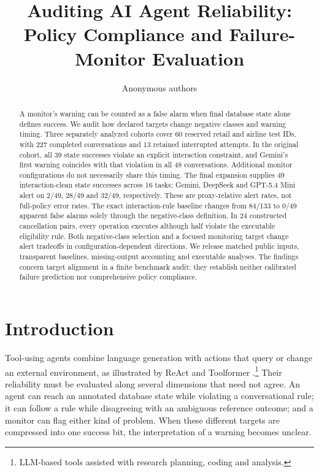 \documentclass[10pt]{article}
\title{Auditing AI Agent Reliability:\\Policy Compliance and Failure-Monitor Evaluation}
\author{Anonymous authors}
\begin{document}
\maketitle
\begin{abstract}
A monitor's warning can be counted as a false alarm when final database state alone defines success. We audit how declared targets change negative classes and warning timing. Three separately analyzed cohorts cover 60 reserved retail and airline test IDs, with 227 completed conversations and 13 retained interrupted attempts. In the original cohort, all 39 state successes violate an explicit interaction constraint, and Gemini's first warning coincides with that violation in all 48 conversations. Additional monitor configurations do not necessarily share this timing. The final expansion supplies 49 interaction-clean state successes across 16 tasks; Gemini, DeepSeek and GPT-5.4 Mini alert on 2/49, 28/49 and 32/49, respectively. These are proxy-relative alert rates, not full-policy error rates. The exact interaction-rule baseline changes from 84/133 to 0/49 apparent false alarms solely through the negative-class definition. In 24 constructed cancellation pairs, every operation executes although half violate the executable eligibility rule. Both negative-class selection and a focused monitoring target change alert tradeoffs in configuration-dependent directions. We release matched public inputs, transparent baselines, missing-output accounting and executable analyses. The findings concern target alignment in a finite benchmark audit; they establish neither calibrated failure prediction nor comprehensive policy compliance.
\end{abstract}

\section{Introduction}
Tool-using agents combine language generation with actions that query or change an external environment, as illustrated by ReAct and Toolformer \citep{yao2023react,schick2023toolformer}.\footnote{LLM-based tools assisted with research planning, coding and analysis.} Their reliability must be evaluated along several dimensions that need not agree. An agent can reach an annotated database state while violating a conversational rule; it can follow a rule while disagreeing with an ambiguous reference outcome; and a monitor can flag either kind of problem. When these different targets are compressed into one success bit, the interpretation of a warning becomes unclear.
\end{document}
